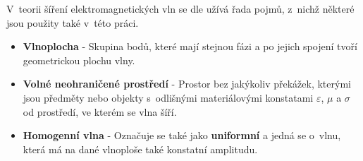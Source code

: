 V~teorii šíření elektromagnetických vln se dle \cite{emp} užívá řada pojmů, z~nichž některé jsou použity také v~této práci.
\begin{itemize}
\item {\bf Vlnoplocha} - Skupina bodů, které mají stejnou fázi a po jejich spojení tvoří geometrickou plochu vlny.
\item {\bf Volné neohraničené prostředí} - Prostor bez jakýkoliv překážek, kterými jsou předměty nebo objekty s~odlišnými materiálovými konstatami  $\varepsilon$, $\mu$ a $\sigma$ od prostředí, ve kterém se vlna šíří.
\item {\bf Homogenní vlna} - Označuje se také jako {\bf uniformní} a jedná se o~vlnu, která má na dané vlnoploše také konstatní amplitudu.
\end{itemize}

